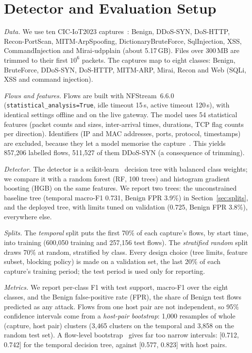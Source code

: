 \section{Detector and Evaluation Setup}\label{sec:setup}

\emph{Data.} We use ten CIC-IoT2023 captures~\cite{neto2023ciciot2023}: Benign, DDoS-SYN, DoS-HTTP, Recon-PortScan, MITM-ArpSpoofing, DictionaryBruteForce, SqlInjection, XSS, CommandInjection and Mirai-udpplain (about 5.17\,GB). Files over 300\,MB are trimmed to their first $10^6$ packets. The captures map to eight classes: Benign, BruteForce, DDoS-SYN, DoS-HTTP, MITM-ARP, Mirai, Recon and Web (SQLi, XSS and command injection).

\emph{Flows and features.} Flows are built with NFStream~6.6.0~\cite{aouini2022nfstream} (\texttt{statistical\_analysis=True}, idle timeout 15\,s, active timeout 120\,s), with identical settings offline and on the live gateway. The model uses 54 statistical features (packet counts and sizes, inter-arrival times, durations, TCP flag counts per direction). Identifiers (IP and MAC addresses, ports, protocol, timestamps) are excluded, because they let a model memorise the capture~\cite{arp2022dos}. This yields 857,206 labelled flows, 511,527 of them DDoS-SYN (a consequence of trimming).

\emph{Detector.} The detector is a scikit-learn~\cite{pedregosa2011sklearn} decision tree with balanced class weights; we compare it with a random forest (RF, 100 trees) and histogram gradient boosting (HGB) on the same features. We report two trees: the unconstrained baseline tree (temporal macro-F1 0.731, Benign FPR 3.9\%) in Section~\ref{sec:splits}, and the deployed tree, with limits tuned on validation (0.725, Benign FPR 3.8\%), everywhere else.

\emph{Splits.} The \emph{temporal} split puts the first 70\% of each capture's flows, by start time, into training (600,050 training and 257,156 test flows). The \emph{stratified random} split draws 70\% at random, stratified by class. Every design choice (tree limits, feature subset, blocking policy) is made on a validation set, the last 20\% of each capture's training period; the test period is used only for reporting.

\emph{Metrics.} We report per-class F1 with test support, macro-F1 over the eight classes, and the Benign false-positive rate (FPR), the share of Benign test flows predicted as any attack. Flows from one host pair are not independent, so 95\% confidence intervals come from a \emph{host-pair bootstrap}: 1,000 resamples of whole (capture, host pair) clusters (3,465 clusters on the temporal and 3,858 on the random test set). A flow-level bootstrap~\cite{efron1994bootstrap} gives far too narrow intervals: [0.712, 0.742] for the temporal decision tree, against [0.577, 0.823] with host pairs.

